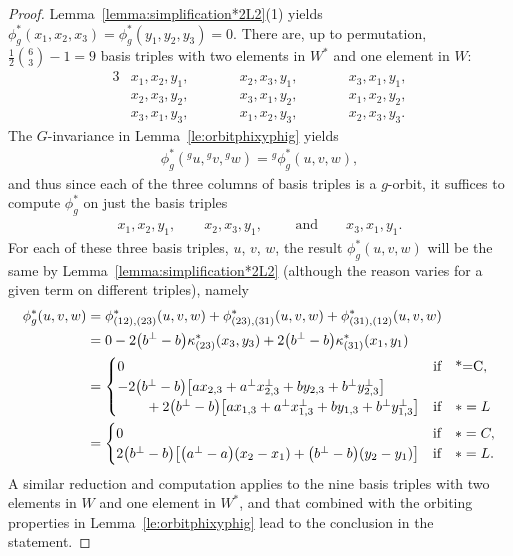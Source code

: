 \documentclass[10pt,a4paper]{amsart}
\numberwithin{equation}{section}
\newcommand{\actby}[1]{{}^{#1}}
\begin{document}
\begin{proof}
Lemma~\ref{lemma:simplification*2L2}(1) yields
$\phi_g^{*}(x_1,x_2,x_3)=\phi_g^{*}(y_1,y_2,y_3)=0$.
There are, up to permutation, $\frac{1}{2}\binom{6}{3}-1=9$
basis triples with two elements in $W^*$ and one element in $W$:
\begin{alignat*}{3}
&x_1, x_2, y_1, &\qquad
&x_2, x_3, y_1, &\qquad
&x_3, x_1, y_1, \\
&x_2, x_3, y_2, &\qquad
&x_3, x_1, y_2, &\qquad
&x_1, x_2, y_2, \\
&x_3, x_1, y_3, &\qquad
&x_1, x_2, y_3, &\qquad
&x_2, x_3, y_3.
\end{alignat*}
The $G$-invariance in Lemma~\ref{le:orbitphixyphig} yields
	\begin{gather*}
	\phi^*_g(\actby{g}u,\actby{g}v,\actby{g}w)=\actby{g}\phi^*_g(u,v,w),
	\end{gather*}
and thus since each of the three columns of basis triples is a $g$-orbit,
it suffices to compute $\phi^*_g$ on just the basis triples
	\begin{gather*}
	x_1,x_2,y_1, \qquad x_2,x_3,y_1, \qquad \text{ and} \qquad x_3,x_1,y_1.
	\end{gather*}
For each of these three basis triples, $u$, $v$, $w$, the result $\phi^*_g(u,v,w)$
will be the same by Lemma~\ref{lemma:simplification*2L2} (although the reason
varies for a given term on different triples), namely
\begin{align*}
\phi^*_g(u,v,w)
&=\phi_{(12),(23)}^{*}(u,v,w)
+\phi_{(23),(31)}^{*}(u,v,w)
+\phi_{(31),(12)}^{*}(u,v,w) \\
&=0-2\big(b^\perp-b\big)\kappa^{*}_{(23)}(x_3,y_3)+2\big(b^\perp-b\big)\kappa^{*}_{(31)}(x_1,y_1) \\
&=
\begin{cases}
0 & \text{if}\quad $*=C$, \\
-2\big(b^\perp-b\big)\big[ax_{2,3} + a^\perp x_{2,3}^\perp + by_{2,3} + b^\perp y_{2,3}^\perp\big] \\ \qquad
{}+2\big(b^\perp-b\big)\big[ax_{1,3} + a^\perp x_{1,3}^\perp + by_{1,3} + b^\perp y_{1,3}^\perp\big] &
\text{if}\quad *=L
\end{cases} \\
&=\begin{cases}
0 & \text{if}\quad *=C, \\
2\big(b^\perp-b\big)\big[\big(a^\perp-a\big)(x_2-x_1) + \big(b^\perp-b\big)(y_2-y_1)\big] & \text{if}\quad *=L.
\end{cases}
\end{align*}
A similar reduction and computation applies to the nine basis triples with two elements
in $W$ and one element in $W^*$, and that combined with the orbiting properties in
Lemma~\ref{le:orbitphixyphig} lead to the conclusion in the statement.
\end{proof}
\end{document}
